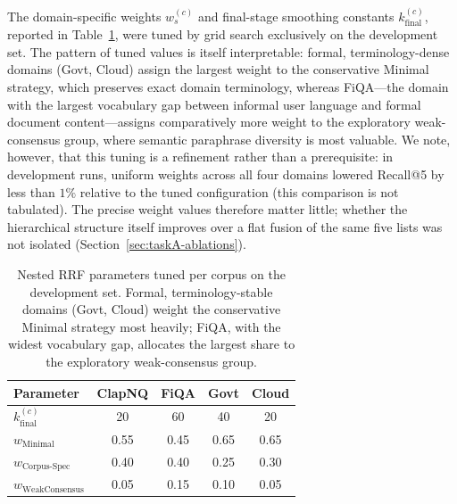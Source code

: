 The domain-specific weights $w_s^{(c)}$ and final-stage smoothing constants $k_{\text{final}}^{(c)}$, reported in Table~\ref{tab:nested-rrf-weights-en}, were tuned by grid search exclusively on the development set. The pattern of tuned values is itself interpretable: formal, terminology-dense domains (Govt, Cloud) assign the largest weight to the conservative Minimal strategy, which preserves exact domain terminology, whereas FiQA---the domain with the largest vocabulary gap between informal user language and formal document content---assigns comparatively more weight to the exploratory weak-consensus group, where semantic paraphrase diversity is most valuable. We note, however, that this tuning is a refinement rather than a prerequisite: in development runs, uniform weights across all four domains lowered Recall@5 by less than $1\%$ relative to the tuned configuration (this comparison is not tabulated). The precise weight values therefore matter little; whether the hierarchical structure itself improves over a flat fusion of the same five lists was not isolated (Section~\ref{sec:taskA-ablations}).

\begin{table}[h]
\centering
\small
\begin{tabular}{lcccc}
\toprule
\textbf{Parameter} & \textbf{ClapNQ} & \textbf{FiQA} & \textbf{Govt} & \textbf{Cloud} \\
\midrule
$k_{\text{final}}^{(c)}$ & 20 & 60 & 40 & 20 \\
$w_{\text{Minimal}}$ & 0.55 & 0.45 & 0.65 & 0.65 \\
$w_{\text{Corpus-Spec}}$ & 0.40 & 0.40 & 0.25 & 0.30 \\
$w_{\text{WeakConsensus}}$ & 0.05 & 0.15 & 0.10 & 0.05 \\
\bottomrule
\end{tabular}
\caption{Nested RRF parameters tuned per corpus on the development set. Formal, terminology-stable domains (Govt, Cloud) weight the conservative Minimal strategy most heavily; FiQA, with the widest vocabulary gap, allocates the largest share to the exploratory weak-consensus group.}
\label{tab:nested-rrf-weights-en}
\end{table}

